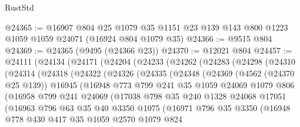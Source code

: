 \begin{lexlean}{RustStd}
\begin{coremodule}
@24365 := @16907
    @804
    @25
    @1079
    @35
    @1151
    @23
    @139
    @143
    @800
    @1223
    @1059
    @1059
    @24071
    (@16924 @804 @1079 @35)
@24366 := @9515 @804
@24369 := @24365 (@9495 (@24366 @23))
@24370 := @12021 @804
@24457 := @24111
    (@24134
      (@24171
        (@24204
          (@24233
            (@24262
              (@24283
                (@24298
                  (@24310
                    (@24314
                      (@24318
                        (@24322
                          (@24326
                            (@24335
                              (@24348
                                (@24369
                                  (@4562 (@24370 @25 @139))
                                  @16945
                                  (@16948
                                    @773
                                    @799
                                    @241
                                    @35
                                    @1059
                                    @24069
                                    @1079
                                    @806
                                    (@16958
                                      @799
                                      @241
                                      @24069
                                      (@17038
                                        @798
                                        @35
                                        @240
                                        @1328
                                        @24068
                                        @17051
                                        (@16963
                                          @796
                                          @63
                                          @35
                                          @40
                                          @3350
                                          @1075
                                          (@16971
                                            @796
                                            @35
                                            @3350
                                            (@16948
                                              @778
                                              @430
                                              @417
                                              @35
                                              @1059
                                              @2570
                                              @1079
                                              @824

\end{coremodule}
\end{lexlean}
